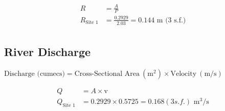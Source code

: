 \begin{align*}
	R &= \frac{A}{P} \\
	R_{\text{Site 1}} &= \frac{0.2929}{2.03} = \text{0.144 m (3 s.f.)} \\
\end{align*}

\subsection{River Discharge}

$\text{Discharge (cumecs)}= \text{Cross-Sectional Area}\ (\si{\metre\squared}) \times \text{Velocity}\ (\si{\metre\per\second})$

\begin{align*}
	Q &= A \times \text{v} \\
	Q_{\text{Site 1}} &= 0.2929 \times 0.5725 = 0.168 (3 s.f.) \text{ m$^3$/s} \\
\end{align*}
